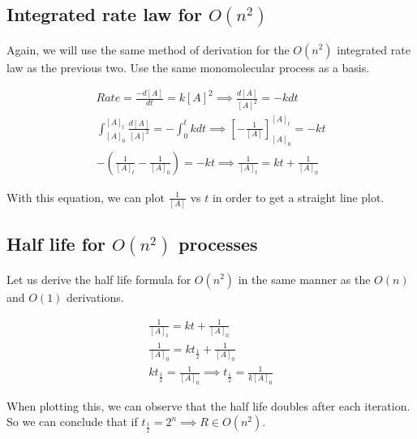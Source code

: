\documentclass[12pt]{book}
\begin{document}
\subsection*{Integrated rate law for $O(n^2)$}

Again, we will use the same method of derivation for the $O(n^2)$ integrated rate law as the previous two. Use the same monomolecular process as a basis.

\begin{align}
    Rate=\frac{-d[A]}{dt}=k[A]^2\implies \frac{d[A]}{[A]^2}=-kdt\\
    \int_{[A]_0}^{[A]_t}\frac{d[A]}{[A]^2}=-\int_{0}^{t}kdt\implies \left[-\frac{1}{[A]}\right]_{[A]_0}^{[A]_t}=-kt\\
    -\left(\frac{1}{[A]_t}-\frac{1}{[A]_0}\right)=-kt\implies \frac{1}{[A]_t}=kt+\frac{1}{[A]_0}
\end{align}

With this equation, we can plot $\frac{1}{[A]}$ vs $t$ in order to get a straight line plot.

\subsection*{Half life for $O(n^2)$ processes}

Let us derive the half life formula for $O(n^2)$ in the same manner as the $O(n)$ and $O(1)$ derivations.

\begin{align}
    \frac{1}{[A]_t}=kt+\frac{1}{[A]_0}\\
    \frac{1}{[A]_0}=kt_{\frac{1}{2}}+\frac{1}{[A]_0}\\
    kt_{\frac{1}{2}}=\frac{1}{[A]_0}\implies t_{\frac{1}{2}}=\frac{1}{k[A]_0}
\end{align}

When plotting this, we can observe that the half life doubles after each iteration. So we can conclude that if $t_{\frac{1}{2}}=2^n\implies R\in O(n^2)$.
\end{document}
